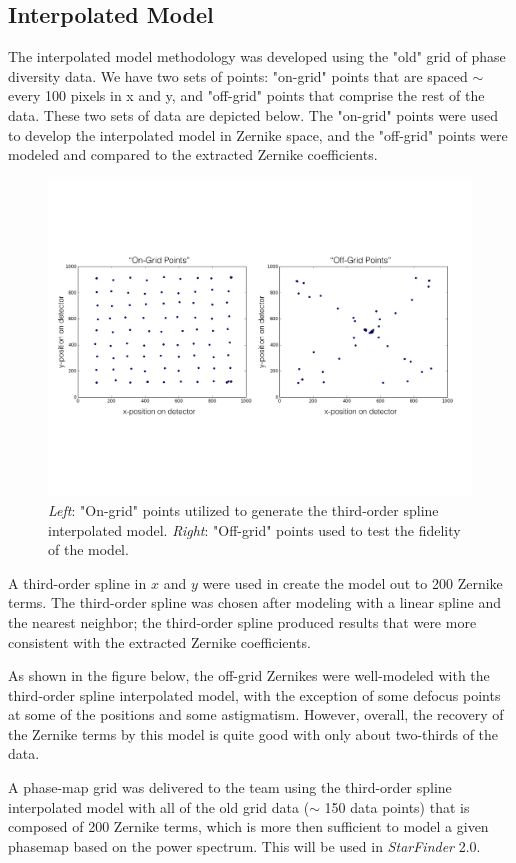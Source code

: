 \subsection{Interpolated Model}
The interpolated model methodology was developed using the "old" grid of phase diversity data. We have two sets of points: "on-grid" points that are spaced $\sim$every 100 pixels in x and y, and "off-grid" points that comprise the rest of the data. These two sets of data are depicted below. The "on-grid" points were used to develop the interpolated model in Zernike space, and the "off-grid" points were modeled and compared to the extracted Zernike coefficients.

\begin{figure}[h!]
\begin{center}
\includegraphics[width=0.7\columnwidth]{figures/on_off_grid_fig.pdf}
\caption{\textit{Left}: "On-grid" points utilized to generate the third-order spline interpolated model. \textit{Right}: "Off-grid" points used to test the fidelity of the model.}
\end{center}
\end{figure}

A third-order spline in $x$ and $y$ were used in create the model out to 200 Zernike terms. The third-order spline was chosen after modeling with a linear spline and the nearest neighbor; the third-order spline produced results that were more consistent with the extracted Zernike coefficients. 

As shown in the figure below, the off-grid Zernikes were well-modeled with the third-order spline interpolated model, with the exception of some defocus points at some of the positions and some astigmatism. However, overall, the recovery of the Zernike terms by this model is quite good with only about two-thirds of the data. 

A phase-map grid was delivered to the team using the third-order spline interpolated model with all of the old grid data ($\sim$ 150 data points) that is composed of 200 Zernike terms, which is more then sufficient to model a given phasemap based on the power spectrum. This will be used in \textit{StarFinder} 2.0.
  
  
  